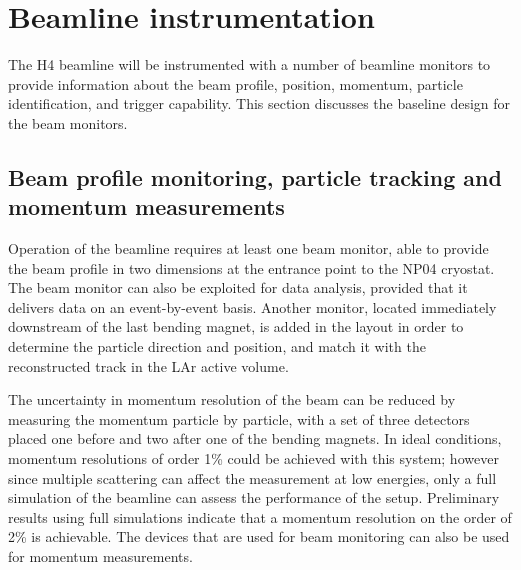\section{Beamline instrumentation}
\label{sec:beaminstruments}

The H4 beamline will be instrumented with a number of beamline monitors to provide information 
 about the beam profile, position, momentum, particle identification, and trigger capability. 
This section discusses the baseline design for the beam monitors. 

\subsection{Beam profile monitoring, particle tracking and momentum measurements}

Operation of the beamline requires at least one beam  monitor, able to provide the beam profile in two dimensions at the entrance point to the NP04 cryostat.   The beam monitor can also be exploited for data analysis, provided that it delivers data on an event-by-event basis. Another monitor, located immediately downstream of the last bending magnet, is added in the layout  in order to determine the particle  direction and position, and match it with the reconstructed track in the LAr active volume.

The uncertainty in momentum resolution of the beam can be reduced by measuring the momentum particle by particle, with a set of three detectors placed one before and two after one of the bending magnets. In ideal conditions, momentum resolutions of order 1\% could be achieved with this system; however since multiple scattering can affect the measurement
at low energies, only a full simulation of the beamline can assess the performance of the setup.  
Preliminary results using full simulations indicate that a momentum resolution on the order of  2\% is achievable. The %
devices that are used for beam monitoring can also be used for momentum measurements.
%
